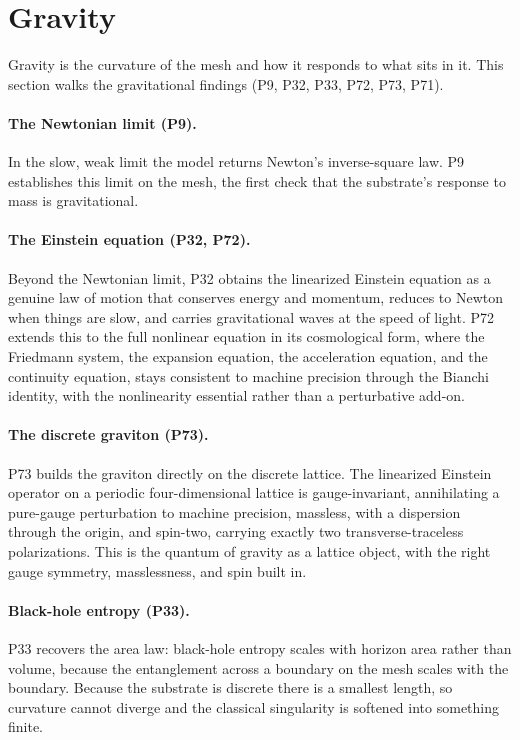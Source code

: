 \section{Gravity}
\label{sec:gravity}

Gravity is the curvature of the mesh and how it responds to what sits in it. This section walks the
gravitational findings (P9, P32, P33, P72, P73, P71).

\paragraph{The Newtonian limit (P9).}
In the slow, weak limit the model returns Newton's inverse-square law. P9 establishes this limit on
the mesh, the first check that the substrate's response to mass is gravitational.

\paragraph{The Einstein equation (P32, P72).}
Beyond the Newtonian limit, P32 obtains the linearized Einstein equation as a genuine law of motion
that conserves energy and momentum, reduces to Newton when things are slow, and carries
gravitational waves at the speed of light. P72 extends this to the full nonlinear equation in its
cosmological form, where the Friedmann system, the expansion equation, the acceleration equation,
and the continuity equation, stays consistent to machine precision through the Bianchi identity, with
the nonlinearity essential rather than a perturbative add-on.

\paragraph{The discrete graviton (P73).}
P73 builds the graviton directly on the discrete lattice. The linearized Einstein operator on a
periodic four-dimensional lattice is gauge-invariant, annihilating a pure-gauge perturbation to
machine precision, massless, with a dispersion through the origin, and spin-two, carrying exactly two
transverse-traceless polarizations. This is the quantum of gravity as a lattice object, with the
right gauge symmetry, masslessness, and spin built in.

\paragraph{Black-hole entropy (P33).}
P33 recovers the area law: black-hole entropy scales with horizon area rather than volume, because
the entanglement across a boundary on the mesh scales with the boundary. Because the substrate is
discrete there is a smallest length, so curvature cannot diverge and the classical singularity is
softened into something finite.

